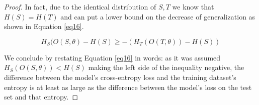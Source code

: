 \documentclass[10pt,a4paper]{amsart}
\begin{document}
\begin{proof}
    In fact, due to the identical distribution of $S, T$ we know that $H(S) = H(T)$ and can put a lower bound on the decrease of generalization as shown in Equation \ref{eq16}.

    \begin{equation}
        H_S(O(S, \theta) - H(S) \geq - \left( H_T(O(T, \theta)) - H(S) \right)
        \label{eq16}
    \end{equation}
    
    We conclude by restating Equation \ref{eq16} in words: as it was assumed $H_S(O(S, \theta)) < H(S)$ making the left side of the inequality negative, the difference between the model's cross-entropy loss and the training dataset's entropy is at least as large as the difference between the model's loss on the test set and that entropy.
    
    \end{proof}
\end{document}
